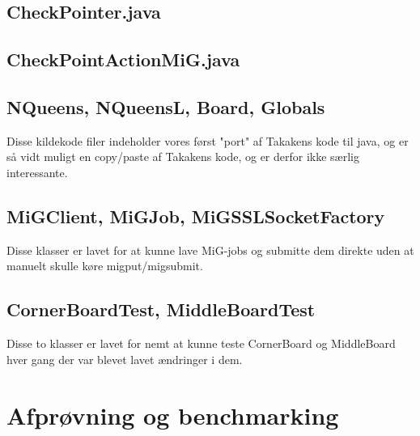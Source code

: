 \documentclass[draft,a4paper,11pt]{article}
\newcommand{\mig}{MiG}
\begin{document}
\subsection{CheckPointer.java}

\subsection{CheckPointActionMiG.java}

\subsection{NQueens, NQueensL, Board, Globals}

Disse kildekode filer indeholder vores først "port" af Takakens kode til java,
og er så vidt muligt en copy/paste af Takakens kode, og er derfor ikke særlig
interessante. 

\subsection{MiGClient, MiGJob, MiGSSLSocketFactory}

Disse klasser er lavet for at kunne lave \mig-jobs og submitte dem direkte uden
at manuelt skulle køre migput/migsubmit. 

\subsection{CornerBoardTest, MiddleBoardTest}

Disse to klasser er lavet for nemt at kunne teste CornerBoard og MiddleBoard
hver gang der var blevet lavet ændringer i dem. 




\section{Afprøvning og benchmarking}\label{benchmarks}

\end{document}
